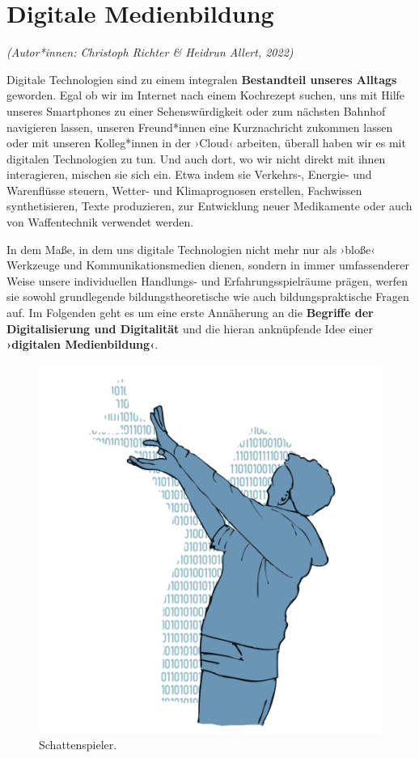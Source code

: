 \documentclass[
  a4paper,
]{book}
\begin{document}
\chapter{Digitale Medienbildung}\label{digitale-medienbildung}

\emph{(Autor*innen: Christoph Richter \& Heidrun Allert, 2022)}

Digitale Technologien sind zu einem integralen \textbf{Bestandteil unseres Alltags} geworden. Egal ob wir im Internet nach einem Kochrezept suchen, uns mit Hilfe unseres Smartphones zu einer Sehenswürdigkeit oder zum nächsten Bahnhof navigieren lassen, unseren Freund*innen eine Kurznachricht zukommen lassen oder mit unseren Kolleg*innen in der ›Cloud‹ arbeiten, überall haben wir es mit digitalen Technologien zu tun. Und auch dort, wo wir nicht direkt mit ihnen interagieren, mischen sie sich ein. Etwa indem sie Verkehrs-, Energie- und Warenflüsse steuern, Wetter- und Klimaprognosen erstellen, Fachwissen synthetisieren, Texte produzieren, zur Entwicklung neuer Medikamente oder auch von Waffentechnik verwendet werden.

In dem Maße, in dem uns digitale Technologien nicht mehr nur als ›bloße‹ Werkzeuge und Kommunikationsmedien dienen, sondern in immer umfassenderer Weise unsere individuellen Handlungs- und Erfahrungsspielräume prägen, werfen sie sowohl grundlegende bildungstheoretische wie auch bildungspraktische Fragen auf. Im Folgenden geht es um eine erste Annäherung an die \textbf{Begriffe der Digitalisierung und Digitalität} und die hieran anknüpfende Idee einer \textbf{›digitalen Medienbildung‹}.

\begin{figure}

{\centering \includegraphics{Figures/01-1-Schattenspieler} 

}

\caption{Schattenspieler.}\label{fig:fig1}
\end{figure}
\end{document}
